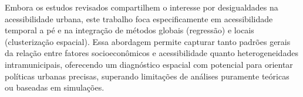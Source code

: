 Embora os estudos revisados compartilhem o interesse por desigualdades na acessibilidade urbana, este trabalho foca especificamente em acessibilidade temporal a pé e na integração de métodos globais (regressão) e locais (clusterização espacial). Essa abordagem permite capturar tanto padrões gerais da relação entre fatores socioeconômicos e acessibilidade quanto heterogeneidades intramunicipais, oferecendo um diagnóstico espacial com potencial para orientar políticas urbanas precisas, superando limitações de análises puramente teóricas ou baseadas em simulações.